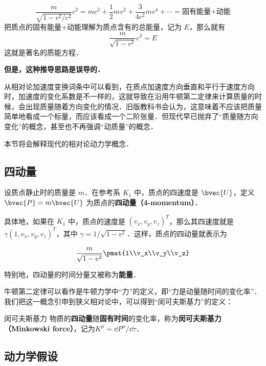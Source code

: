 \begin{equation}
\frac{m}{\sqrt{1-v^2/c^2}}c^2=mc^2+\frac{1}{2}mv^2+\frac{3}{4c^2}mv^4+\cdots=\text{固有能量+动能}
\end{equation}
把质点的固有能量+动能理解为质点含有的总能量，记为 $E$，那么就有
\begin{equation}
\frac{m}{\sqrt{1-v^2}}c^2=E
\end{equation}
这就是著名的质能方程．

\textbf{但是，这种推导思路是误导的．}


从相对论加速度变换词条中可以看到，在质点加速度方向垂直和平行于速度方向时，加速度的变化系数是不一样的，这就导致在沿用牛顿第二定律来计算质量的时候，会出现质量随着方向变化的情况．旧版教科书会认为，这意味着不应该把质量简单地看成一个标量，而应该看成一个二阶张量．但现代早已抛弃了“质量随方向变化”的概念，甚至也不再强调“动质量”的概念．

本节将会解释现代的相对论动力学概念．

\subsection{四动量}

设质点静止时的质量是 $m$．在参考系 $K_1$ 中，质点的四速度是 $\bvec{U}$，定义 $\bvec{P}=m\bvec{U}$ 为质点的\textbf{四动量（4-momentum）}．

具体地，如果在 $K_1$ 中，质点的速度是 $(v_x, v_y, v_z)^T$，那么其四速度就是 $\gamma(1, v_x, v_y, v_z)^T$，其中 $\gamma=1/\sqrt{1-v^2}$．这样，质点的四动量就表示为

\begin{equation}
\frac{m}{\sqrt{1-v^2}}\pmat{1\\v_x\\v_y\\v_z}
\end{equation}

特别地，四动量的时间分量又被称为\textbf{能量}．

牛顿第二定律可以看作是牛顿力学中“力”的定义，即“力是动量随时间的变化率”．我们把这一概念引申到狭义相对论中，可以得到“闵可夫斯基力”的定义：

\begin{definition}{闵可夫斯基力}
物质的\textbf{四动量}随\textbf{固有时间}的变化率，称为\textbf{闵可夫斯基力（Minkowski force）}，记为$K^{\mu}=\dd P^\mu/\dd\tau$．
\end{definition}


\subsection{动力学假设}

